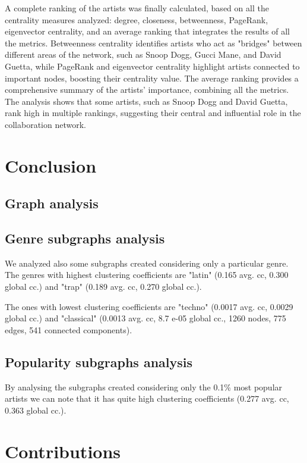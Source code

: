 \documentclass[a4paper, 12pt, conference]{ieeeconf}      %
\begin{document}
A complete ranking of the artists was finally calculated, based on all the centrality measures analyzed: degree, closeness, betweenness, PageRank, eigenvector centrality, and an average ranking that integrates the results of all the metrics. Betweenness centrality identifies artists who act as "bridges" between different areas of the network, such as Snoop Dogg, Gucci Mane, and David Guetta, while PageRank and eigenvector centrality highlight artists connected to important nodes, boosting their centrality value. The average ranking provides a comprehensive summary of the artists' importance, combining all the metrics. The analysis shows that some artists, such as Snoop Dogg and David Guetta, rank high in multiple rankings, suggesting their central and influential role in the collaboration network.
\section{Conclusion}
\subsection{Graph analysis}

\subsection{Genre subgraphs analysis}
We analyzed also some subgraphs created considering only a particular genre.
The genres with highest clustering coefficients are "latin" (0.165 avg. cc,  0.300 global cc.) 
and "trap" (0.189 avg. cc,  0.270 global cc.).

The ones with lowest clustering coefficients are "techno" (0.0017 avg. cc,  0.0029 global cc.)  
and "classical" (0.0013 avg. cc,  8.7 e-05 global cc., 1260 nodes, 775 edges, 541 
connected components).


\subsection{Popularity subgraphs analysis}



By analysing the subgraphs created considering only the 0.1\% most popular artists we can 
note that it has quite high clustering coefficients (0.277 avg. cc,  0.363 global cc.).





\section*{Contributions}

\printbibliography[nottype=online]
\end{document}
